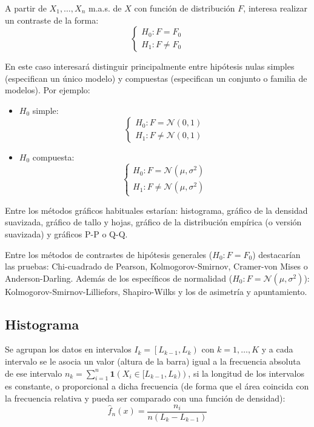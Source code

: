 \documentclass[
  spanish,
  10pt,
]{book}
\renewcommand{\mathbf}[1]{\symbf{#1}}
\theoremstyle{break}
\theoremstyle{nonumberplain}
\begin{document}
A partir de \(X_1,\ldots,X_n\) m.a.s. de \(X\) con función de
distribución \(F\), interesa realizar un contraste de la forma:
\[\left \{
\begin{array}{l}
H_0:F=F_0\\
H_1:F\neq F_0
\end{array}
\right.\]

En este caso interesará distinguir principalmente entre hipótesis nulas simples (especifican un único modelo) y compuestas (especifican un conjunto o familia de modelos).
Por ejemplo:

\begin{itemize}
\item
  \(H_0\) simple:
  \[\left \{
  \begin{array}{l}  
  H_0:F= \mathcal{N}(0,1)\\
  H_1:F\neq \mathcal{N}(0,1)
  \end{array}
  \right.\]
\item
  \(H_0\) compuesta:
  \[\left \{
  \begin{array}{l}  
  H_0:F= \mathcal{N}(\mu,\sigma^2)\\
  H_1:F\neq \mathcal{N}(\mu,\sigma^2)
  \end{array}
  \right.\]
\end{itemize}

Entre los métodos gráficos habituales estarían: histograma, gráfico de la densidad suavizada, gráfico de tallo y hojas, gráfico de la distribución empírica (o versión suavizada) y gráficos P-P o Q-Q.

Entre los métodos de contrastes de hipótesis generales (\(H_0:F=F_0\)) destacarían las pruebas: Chi-cuadrado de Pearson, Kolmogorov-Smirnov, Cramer-von Mises o Anderson-Darling.
Además de los específicos de normalidad (\(H_0:F= \mathcal{N}(\mu,\sigma^2)\)): Kolmogorov-Smirnov-Lilliefors, Shapiro-Wilks y los de asimetría y apuntamiento.

\subsection{Histograma}\label{histograma}

Se agrupan los datos en intervalos \(I_{k}=\left[  L_{k-1},L_{k}\right)\) con \(k=1, \ldots, K\) y a cada intervalo se le asocia un valor (altura de la barra) igual a la frecuencia absoluta de ese intervalo \(n_k = \sum_{i=1}^{n}\mathbf{1}\left( X_i \in [L_{k-1},L_{k}) \right)\), si la longitud de los intervalos es constante, o proporcional a dicha frecuencia (de forma que el área coincida con la frecuencia relativa y pueda ser comparado con una función de densidad):
\[\hat{f}_n(x)=\frac{n_{i}}{n\left(  L_{k}-L_{k-1}\right)}\]
\end{document}

